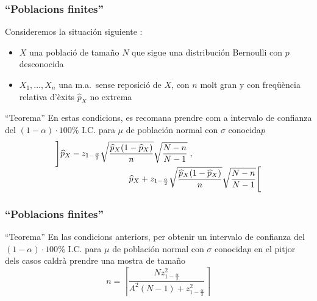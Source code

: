 \documentclass[12pt,t]{beamer}\usepackage[]{graphicx}\usepackage[]{color}
\theoremstyle{plain}
\theoremstyle{definition}
\begin{document}
\begin{frame}
\frametitle{``Poblacions finites''}
\vspace*{-2ex}

Consideremos  la situación siguiente  :
\begin{itemize}
\item  $X$ una població de  tamaño  $N$ que sigue una distribución Bernoulli con $p$ desconocida

\item $X_1,\ldots,X_n$ una m.a.\ sense reposició de $X$, con $n$ molt gran  y con freqüència relativa d'èxits $\widehat{p}_{X}$ no extrema
\end{itemize}
\medskip

\begin{block}{``Teorema''}
En estas  condicions, es recomana prendre com a intervalo  de confianza  del $(1-\alpha)\cdot 100\%$ I.C. para $\mu$ de población normal con $\sigma$ conocida$p$
$$
\begin{array}{l}
\displaystyle \left]\widehat{p}_{X}-z_{1-\frac{\alpha}{2}}\sqrt{\frac{\widehat{p}_{X}
(1-\widehat{p}_{X})}{n}}\sqrt{\frac{N-n}{N-1}}\right.,\\[1ex]
\hspace*{3cm}\displaystyle
\left.\widehat{p}_{X}+z_{1-\frac{\alpha}{2}}\sqrt{\frac{\widehat{p}_{X}
(1-\widehat{p}_{X})}{n}}\sqrt{\frac{N-n}{N-1}}\right[
\end{array}$$
\end{block}
\end{frame}


\begin{frame}
\frametitle{``Poblacions finites''}

\begin{block}{``Teorema''}
En las condicions anteriors, per obtenir un intervalo de confianza  del $(1-\alpha)\cdot 100\%$ I.C. para $\mu$ de población normal con $\sigma$ conocida$p$ en el pitjor dels casos caldrà prendre una mostra de  tamaño 
$$
n=\left\lceil\frac{Nz_{1-\frac{\alpha}{2}}^2}{A^2(N-1)+z_{1-\frac{\alpha}{2}}^2}\right\rceil
$$
\end{block}
\end{frame}
\end{document}
